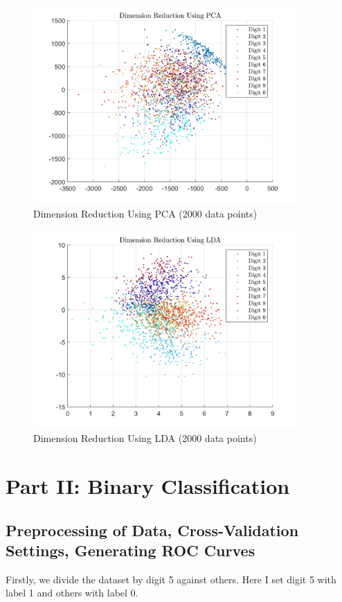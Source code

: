 \documentclass[a4paper,12pt]{article} %
\begin{document}
\begin{figure}[!htbp]
	\centering
	\includegraphics[width=0.9\textwidth]{PCAALL.jpg}
	\caption{Dimension Reduction Using PCA (2000 data points)}
	\label{fig:10}
\end{figure}

\begin{figure}[!htbp]
	\centering
	\includegraphics[width=0.9\textwidth]{LDAALL.jpg}
	\caption{Dimension Reduction Using LDA (2000 data points)}
	\label{fig:11}
\end{figure}

\section{Part II: Binary Classification}
\subsection{Preprocessing of Data, Cross-Validation Settings, Generating ROC Curves}
\hspace{0.7cm}
Firstly, we divide the dataset by digit 5 against others. Here I set digit 5 with label 1 and others with label 0.
\end{document}
